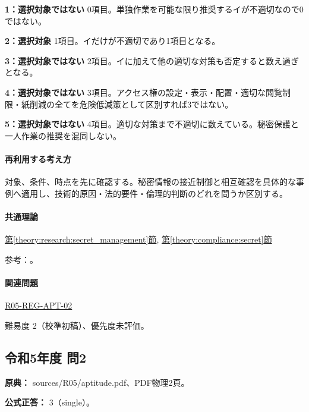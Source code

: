 \noindent\textbf{1：選択対象ではない} 0項目。単独作業を可能な限り推奨するイが不適切なので0ではない。\par

\noindent\textbf{2：選択対象} 1項目。イだけが不適切であり1項目となる。\par

\noindent\textbf{3：選択対象ではない} 2項目。イに加えて他の適切な対策も否定すると数え過ぎとなる。\par

\noindent\textbf{4：選択対象ではない} 3項目。アクセス権の設定・表示・配置・適切な閲覧制限・紙削減の全てを危険低減策として区別すれば3ではない。\par

\noindent\textbf{5：選択対象ではない} 4項目。適切な対策まで不適切に数えている。秘密保護と一人作業の推奨を混同しない。\par

\paragraph{再利用する考え方} 対象、条件、時点を先に確認する。秘密情報の接近制御と相互確認を具体的な事例へ適用し、技術的原因・法的要件・倫理的判断のどれを問うか区別する。

\paragraph{共通理論} \hyperref[theory:research:secret_management]{第\ref*{theory:research:secret_management}節}, \hyperref[theory:compliance:secret]{第\ref*{theory:compliance:secret}節}

\par 参考：\cite{meti_secret_handbook2024}。

\paragraph{関連問題} \hyperref[q:r05-reg-apt-02]{R05-REG-APT-02}

\par 難易度 2（校準初稿）、優先度未評価。

\subsection{令和5年度 問2}
\label{q:r05-reg-apt-02}

\noindent\textbf{原典：} sources/R05/aptitude.pdf、PDF物理2頁。

\textbf{公式正答：} 3（single）。

